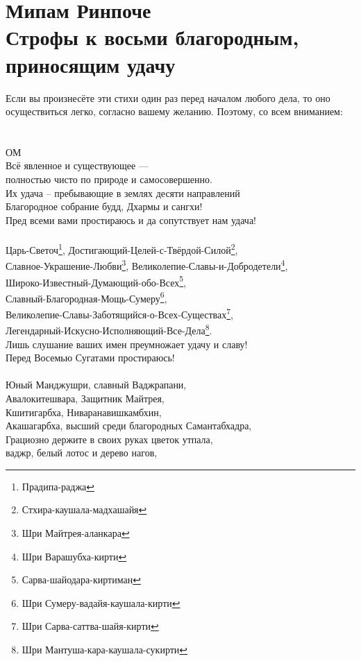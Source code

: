 \section{Мипам Ринпоче\\Строфы к восьми благородным, \\приносящим удачу}
\scriptsize
Если вы произнесёте эти стихи один раз перед началом любого дела,
то оно осуществиться легко, согласно вашему желанию. Поэтому, со всем вниманием:\\
\normalsize
\\
\\
ОМ\\
Всё явленное и существующее — \\ \indent полностью чисто по природе и самосовершенно.\\
Их удача – пребывающие в землях десяти направлений \\
Благородное собрание будд, Дхармы и сангхи!\\
Пред всеми вами простираюсь и да сопутствует нам удача!\\
\\
Царь-Светоч\footnote{Прадипа-раджа}, Достигающий-Целей-с-Твёрдой-Силой\footnote{Стхира-каушала-мадхашайя},\\
Славное-Украшение-Любви\footnote{ Шри Майтрея-аланкара},  Великолепие-Славы-и-Добродетели\footnote{ Шри Варашубха-кирти},\\
Широко-Известный-Думающий-обо-Всех\footnote{ Сарва-шайодара-киртиман},\\
Славный-Благородная-Мощь-Сумеру\footnote{ Шри Сумеру-вадайя-каушала-кирти},\\
Великолепие-Славы-Заботящийся-о-Всех-Существах\footnote{ Шри Сарва-саттва-шайя-кирти},\\
Легендарный-Искусно-Исполняющий-Все-Дела\footnote{ Шри Мантуша-кара-каушала-сукирти}. \\
Лишь слушание ваших имен преумножает удачу и славу!\\
Перед Восемью Сугатами простираюсь!\\
\\
\newpage
Юный Манджушри, славный Ваджрапани,\\
Авалокитешвара, Защитник Майтрея,\\
Кшитигарбха, Ниваранавишкамбхин,\\
Акашагарбха, высший среди благородных Самантабхадра,\\
Грациозно держите в своих руках цветок утпала, \\
ваджр, белый лотос и дерево нагов,\\
